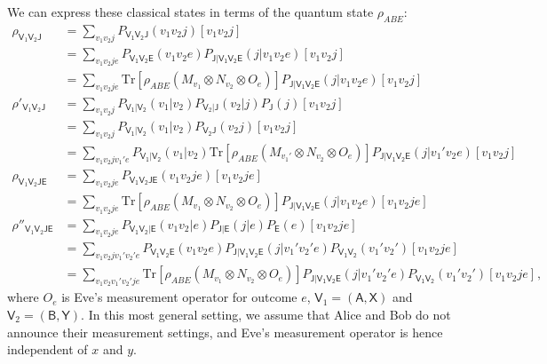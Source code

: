 \documentclass[10pt, a4paper]{article}
\numberwithin{equation}{section} %
\theoremstyle{definition}
\theoremstyle{plain}
\newcommand{\?}{\mathrel{?}} %
\newcommand{\Tr}{\mathrm{Tr}} %
\newcommand{\crv}[1]{\mathsf{#1}}
\newcommand{\proj}[2][]{{[#2]}_{#1}}
\begin{document}
    We can express these classical states in terms of the quantum state \(\rho_{ABE}\):
    \begin{align}
      \rho_{\crv{V}_1\crv{V}_2\crv{J}} &= \sum_{v_1 v_2 j} P_{\crv{V_1V_2J}}(v_1v_2j) \proj{v_1v_2j} \\
                                         &= \sum_{v_1 v_2 j e}  P_{\crv{V_1V_2E}}(v_1v_2e) P_{\crv{J|V_1V_2E}}(j|v_1v_2e) \proj{v_1v_2j} \\
                                         &= \sum_{v_1 v_2 j e} \Tr\left[\rho_{ABE} \left(M_{v_1} \otimes N_{v_2} \otimes O_e\right)\right] P_{\crv{J|V_1V_2E}}(j|v_1v_2e) \proj{v_1v_2j} \\
      \rho'_{\crv{V}_1\crv{V}_2\crv{J}} &= \sum_{v_1 v_2 j} P_{\crv{V_1|V_2}}(v_1|v_2) P_{\crv{V}_2|\crv{J}}(v_2|j) P_{\crv{J}}(j) \proj{v_1v_2j} \\
                                         &= \sum_{v_1 v_2 j} P_{\crv{V_1|V_2}}(v_1|v_2) P_{\crv{V_2J}}(v_2j) \proj{v_1v_2j} \\
                                         &= \sum_{v_1 v_2 j v_1' e} P_{\crv{V_1|V_2}}(v_1|v_2) \Tr\left[\rho_{ABE} \left(M_{v_1'} \otimes N_{v_2} \otimes O_e\right)\right] P_{\crv{J|V_1V_2E}}(j|v_1'v_2e) \proj{v_1v_2j} \\
      \rho_{\crv{V}_1\crv{V}_2\crv{JE}} &= \sum_{v_1 v_2 j e} P_{\crv{V_1V_2JE}}(v_1v_2je) \proj{v_1v_2je} \\
                                         &= \sum_{v_1 v_2 j e} \Tr\left[\rho_{ABE} \left(M_{v_1} \otimes N_{v_2} \otimes O_e\right)\right] P_{\crv{J|V_1V_2E}}(j|v_1v_2e) \proj{v_1v_2je} \\
      \rho''_{\crv{V}_1\crv{V}_2\crv{JE}} &= \sum_{v_1 v_2 j e} P_{\crv{V_1V_2|E}}(v_1v_2|e) P_{\crv{J|E}}(j|e) P_{\crv{E}}(e) \proj{v_1v_2je} \\
                                         &= \sum_{v_1 v_2 j v_1' v_2' e} P_{\crv{V_1V_2E}}(v_1v_2e) P_{\crv{J|V_1V_2E}}(j|v_1'v_2'e) P_{\crv{V_1V_2}}(v_1'v_2')\proj{v_1v_2je} \\
                                         &= \sum_{v_1 v_2 v_1' v_2' j e} \Tr\left[\rho_{ABE} \left(M_{v_1} \otimes N_{v_2} \otimes O_e\right)\right] P_{\crv{J|V_1V_2E}}(j|v_1'v_2'e) P_{\crv{V_1V_2}}(v_1'v_2')\proj{v_1v_2je},
    \end{align}
    where \(O_e\) is Eve's measurement operator for outcome \(e\), \(\crv{V}_1 = (\crv{A,X})\) and \(\crv{V}_2 = (\crv{B,Y})\). In this most general setting, we assume that Alice and Bob do not announce their measurement settings, and Eve's measurement operator is hence independent of \(x\) and \(y\). 
\end{document}

